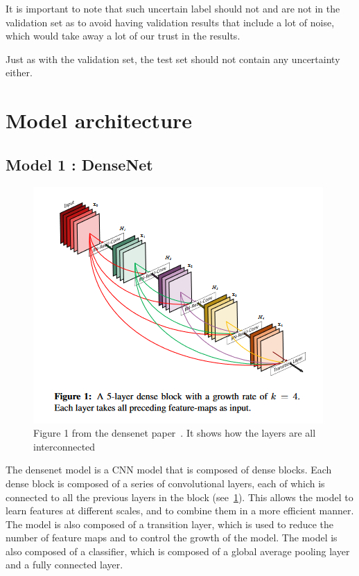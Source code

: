 \documentclass[11pt]{article}
\begin{document}
        It is important to note that such uncertain label should not and are not in the validation set as to avoid having validation results that include a lot of noise, which would take away a lot of our trust
        in the results.

        Just as with the validation set, the test set should not contain any uncertainty either.
    \section{Model architecture}

    \subsection{Model 1 : DenseNet~\cite{densenet}}


    \begin{figure}[h]

         \centering
         \includegraphics[width=0.5 \textwidth]{plots/densenet_figure}
         \caption{Figure 1 from the densenet paper~\cite{densenet}. It shows how the layers are all interconnected}
         \label{fig:densenet_figure}

    \end{figure}

        The densenet model is a CNN model that is composed of dense blocks. Each dense block is composed of a series of convolutional layers,
        each of which is connected to all the previous layers in the block (see~\ref{fig:densenet_figure}). This allows the model to learn features at different scales, and to
        combine them in a more efficient manner. The model is also composed of a transition layer, which is used to reduce the number of feature maps
        and to control the growth of the model. The model is also composed of a classifier, which is composed of a global average pooling layer and a fully connected layer.
\end{document}
